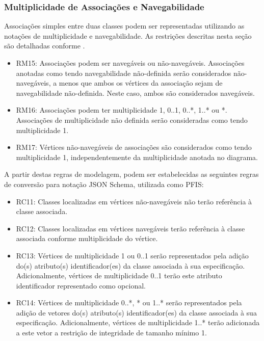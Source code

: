 
\subsubsection{Multiplicidade de Associações e Navegabilidade}

Associações simples entre duas classes podem ser representadas utilizando as notações de multiplicidade e navegabilidade. As restrições descritas nesta seção são detalhadas conforme .

\begin{itemize}
    \item RM15: Associações podem ser navegáveis ou não-navegáveis. Associações anotadas como tendo navegabilidade não-definida serão considerados não-navegáveis, a menos que ambos os vértices da associação sejam de navegabilidade não-definida. Neste caso, ambos são considerados navegáveis.

    \item RM16: Associações podem ter multiplicidade 1, 0..1, 0..*, 1..* ou *. Associações de multiplicidade não definida serão consideradas como tendo multiplicidade 1.

    \item RM17: Vértices não-navegáveis de associações são considerados como tendo multiplicidade 1, independentemente da multiplicidade anotada no diagrama.
\end{itemize}

A partir destas regras de modelagem, podem ser estabelecidas as seguintes regras de conversão para notação JSON Schema, utilizada como PFIS:

\begin{itemize}
    \item RC11: Classes localizadas em vértices não-navegáveis não terão referência à classe associada.

    \item RC12: Classes localizadas em vértices navegáveis terão referência à classe associada conforme multiplicidade do vértice.

    \item RC13: Vértices de multiplicidade 1 ou 0..1 serão representados pela adição do(s) atributo(s) identificador(es) da classe associada à sua especificação. Adicionalmente, vértices de multiplicidade 0..1 terão este atributo identificador representado como opcional.

    \item RC14: Vértices de multiplicidade 0..*, * ou 1..* serão representados pela adição de vetores do(s) atributo(s) identificador(es) da classe associada à sua especificação. Adicionalmente, vértices de multiplicidade 1..* terão adicionada a este vetor a restrição de integridade de tamanho mínimo 1.
\end{itemize}

